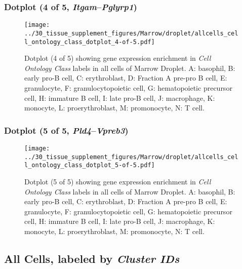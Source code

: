 \clearpage

\subsubsection{Dotplot (4 of 5, \emph{Itgam}--\emph{Pglyrp1})}
\begin{figure}[h]
\centering
\texttt{[image: ../30\_tissue\_supplement\_figures/Marrow/droplet/allcells\_cell\_ontology\_class\_dotplot\_4-of-5.pdf]}

\caption{ Dotplot (4 of 5)  showing gene expression enrichment in \emph{Cell Ontology Class} labels in all cells of Marrow Droplet. A: basophil, B: early pro-B cell, C: erythroblast, D: Fraction A pre-pro B cell, E: granulocyte, F: granulocytopoietic cell, G: hematopoietic precursor cell, H: immature B cell, I: late pro-B cell, J: macrophage, K: monocyte, L: proerythroblast, M: promonocyte, N: T cell.}
\end{figure}


\clearpage

\subsubsection{Dotplot (5 of 5, \emph{Pld4}--\emph{Vpreb3})}
\begin{figure}[h]
\centering
\texttt{[image: ../30\_tissue\_supplement\_figures/Marrow/droplet/allcells\_cell\_ontology\_class\_dotplot\_5-of-5.pdf]}

\caption{ Dotplot (5 of 5)  showing gene expression enrichment in \emph{Cell Ontology Class} labels in all cells of Marrow Droplet. A: basophil, B: early pro-B cell, C: erythroblast, D: Fraction A pre-pro B cell, E: granulocyte, F: granulocytopoietic cell, G: hematopoietic precursor cell, H: immature B cell, I: late pro-B cell, J: macrophage, K: monocyte, L: proerythroblast, M: promonocyte, N: T cell.}
\end{figure}


\clearpage

\subsection{All Cells, labeled by \emph{Cluster IDs}}
